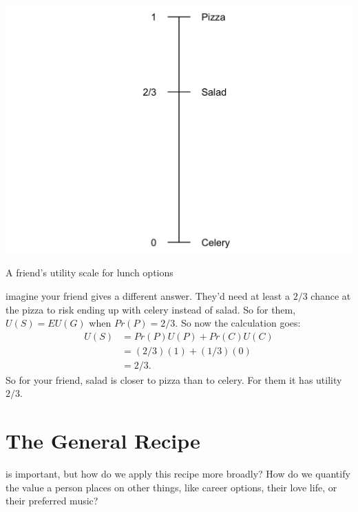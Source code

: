 \documentclass[justified]{tufte-book}
\renewcommand{\u}{U}
\newcommand{\p}{Pr}
\newcommand{\EU}{EU}
\theoremstyle{definition}
\theoremstyle{definition}
\theoremstyle{definition}
\theoremstyle{remark}
\begin{document}
\begin{marginfigure}
\includegraphics{_main_files/figure-latex/unnamed-chunk-110-1} \caption[A friend's utility scale for lunch options]{A friend's utility scale for lunch options}\label{fig:unnamed-chunk-110}
\end{marginfigure}

 imagine your friend gives a different answer. They'd need at least a \(2/3\) chance at the pizza to risk ending up with celery instead of salad. So for them, \(\u(S) = \EU(G)\) when \(\p(P) = 2/3\). So now the calculation goes:
\[
  \begin{aligned}
    \u(S) &= \p(P)\u(P) + \p(C)\u(C)\\
      &= (2/3)(1) + (1/3)(0)\\
      &= 2/3.
  \end{aligned}
\]
So for your friend, salad is closer to pizza than to celery. For them it has utility \(2/3\).

\hypertarget{the-general-recipe}{%
\section{The General Recipe}\label{the-general-recipe}}

 is important, but how do we apply this recipe more broadly? How do we quantify the value a person places on other things, like career options, their love life, or their preferred music?
\end{document}
